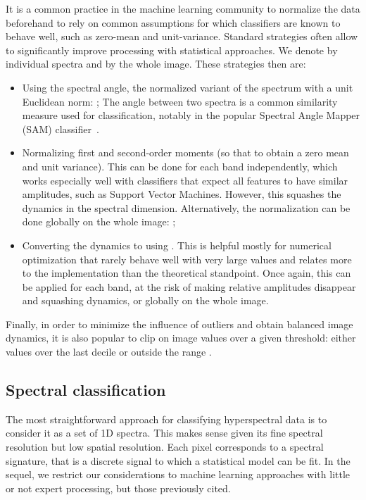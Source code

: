 \documentclass[journal]{IEEEtran}
\begin{document}
It is a common practice in the machine learning community to normalize the data beforehand to rely on common assumptions for which classifiers are known to behave well, such as zero-mean and unit-variance. Standard strategies often allow to significantly improve processing with statistical approaches. We denote by  individual spectra and by  the whole image. These strategies then are:
\begin{itemize}
\item Using the spectral angle, the normalized variant of the spectrum with a unit Euclidean norm:
;
The angle between two spectra is a common similarity measure used for classification, notably in the popular Spectral Angle Mapper (SAM) classifier~\cite{yuhas_discrimination_1992}.
\item Normalizing first and second-order moments (so that to obtain a zero mean and unit variance). This can be done for each band independently, which works especially well with classifiers that expect all features to have similar amplitudes, such as Support Vector Machines. However, this squashes the dynamics in the spectral dimension. Alternatively, the normalization can be done globally on the whole image:
;
\item Converting the dynamics to  using  . This is helpful mostly for numerical optimization that rarely behave well with very large values and relates more to the implementation than the theoretical standpoint. Once again, this can be applied for each band, at the risk of making relative amplitudes disappear and squashing dynamics, or globally on the whole image.
\end{itemize}

Finally, in order to minimize the influence of outliers and obtain balanced image dynamics, it is also popular to clip on image values over a given threshold: either values over the last decile or outside the range .



\subsection{Spectral classification}

The most straightforward approach for classifying hyperspectral data is to consider it as a set of 1D spectra. This makes sense given its fine spectral resolution but low spatial resolution. Each pixel corresponds to a spectral signature, that is a discrete signal to which a statistical model can be fit. In the sequel, we restrict our considerations to machine learning approaches with little or not expert processing, but those previously cited.
\end{document}
